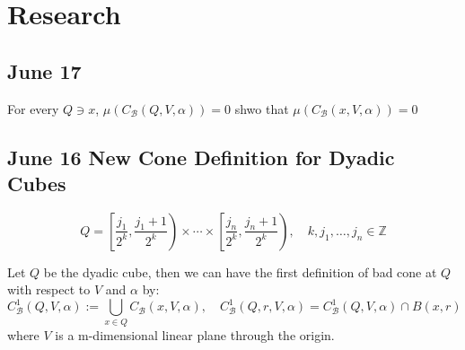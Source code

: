 \section{Research}


\subsection{June 17}
\begin{problem}
    For every $Q\ni x$, $\mu(C_\mathcal{B}(Q, V, \alpha)) = 0$ shwo that $\mu(C_\mathcal{B}(x, V, \alpha)) = 0$
\end{problem}



\newpage
\subsection{June 16 New Cone Definition for Dyadic Cubes}
\begin{definition}
    $$
Q=\left[\frac{j_{1}}{2^{k}}, \frac{j_{1}+1}{2^{k}}\right) \times \cdots \times\left[\frac{j_{n}}{2^{k}}, \frac{j_{n}+1}{2^{k}}\right), \quad k, j_{1}, \ldots, j_{n} \in \mathbb{Z}
$$
\end{definition}

\begin{definition} Let $Q$ be the dyadic cube, then we can have the first definition of bad cone at $Q$ with respect to $V$ and $\alpha$ by:
    $$C^1_{\mathcal{B}}(Q, V, \alpha) := \bigcup_{x\in Q} C_\mathcal{B}(x, V, \alpha), \quad C^1_{\mathcal{B}}(Q, r, V, \alpha) = C^1_{\mathcal{B}}(Q, V, \alpha) \cap B(x,r)$$
    where $V$ is a m-dimensional linear plane through the origin. 
\end{definition}

